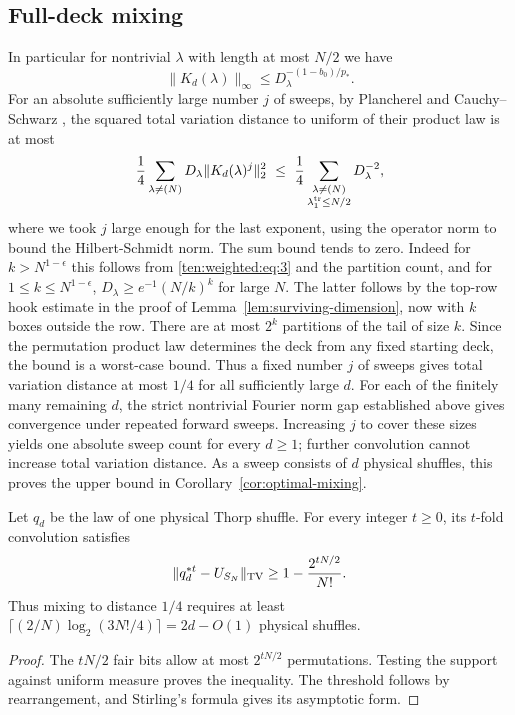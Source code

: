 \subsection{Full-deck mixing}
\label{ten:weighted:part:285}
In particular for nontrivial \(\lambda\) with length at most \(N/2\) we have
\[
 \|K_d(\lambda)\|_\infty\le D_\lambda^{-(1-b_0)/p_*}.
\]
For an absolute sufficiently large number \(j\) of sweeps, by Plancherel and Cauchy--Schwarz \cite[Sections~2 and~3]{DiaconisShahshahani1981}, the squared total variation distance to uniform of their product law is at most
\[
 \frac14\sum_{\lambda\ne(N)} D_\lambda \|K_d(\lambda)^j\|_2^2
 \ \le\ \frac14\sum_{\substack{\lambda\ne(N)\\ \lambda^{\rm tr}_1\le N/2}} D_\lambda^{-2},
\]
where we took \(j\) large enough for the last exponent, using the operator norm to bound the Hilbert-Schmidt norm. The sum bound tends to zero. Indeed for \(k>N^{1-\epsilon}\) this follows from \eqref{ten:weighted:eq:3} and the partition count, and for \(1\le k\le N^{1-\epsilon}\), \(D_\lambda\ge e^{-1}(N/k)^k\) for large \(N\). The latter follows by the top-row hook estimate in the proof of Lemma~\ref{lem:surviving-dimension}, now with \(k\) boxes outside the row. There are at most \(2^k\) partitions of the tail of size \(k\). Since the permutation product law determines the deck from any fixed starting deck, the bound is a worst-case bound. Thus a fixed number $j$ of sweeps gives total variation distance at most $1/4$ for all sufficiently large $d$. For each of the finitely many remaining $d$, the strict nontrivial Fourier norm gap established above gives convergence under repeated forward sweeps. Increasing $j$ to cover these sizes yields one absolute sweep count for every $d\ge1$; further convolution cannot increase total variation distance. As a sweep consists of $d$ physical shuffles, this proves the upper bound in Corollary~\ref{cor:optimal-mixing}.

\begin{proposition}\label{ten:support}
Let $q_d$ be the law of one physical Thorp shuffle. For every integer $t\ge0$, its $t$-fold convolution satisfies
\[
 \|q_d^{*t}-U_{S_N}\|_{\rm TV}\ge1-\frac{2^{tN/2}}{N!}.
\]
Thus mixing to distance $1/4$ requires at least
$\lceil(2/N)\log_2(3N!/4)\rceil=2d-O(1)$ physical shuffles.
\end{proposition}
\begin{proof}
The $tN/2$ fair bits allow at most $2^{tN/2}$ permutations. Testing the support against uniform measure proves the inequality. The threshold follows by rearrangement, and Stirling's formula gives its asymptotic form.
\end{proof}
